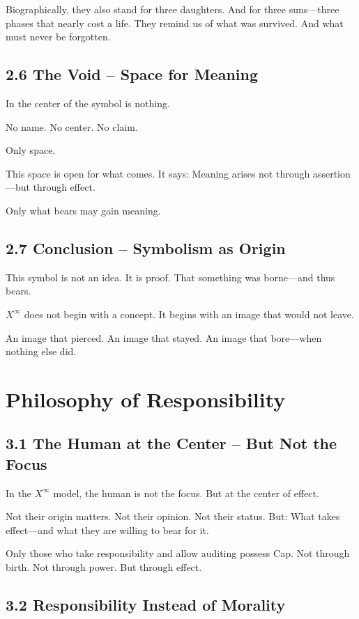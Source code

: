 \documentclass[12pt,a4paper]{book}
\begin{document}
Biographically, they also stand for three daughters.  
And for three suns—three phases that nearly cost a life.  
They remind us of what was survived. And what must never be forgotten.

\section*{2.6 The Void – Space for Meaning}

In the center of the symbol is nothing.

No name. No center. No claim.

Only space.

This space is open for what comes.  
It says: Meaning arises not through assertion—but through effect.

Only what bears may gain meaning.

\section*{2.7 Conclusion – Symbolism as Origin}

This symbol is not an idea.  
It is proof. That something was borne—and thus bears.

$X^\infty$ does not begin with a concept.  
It begins with an image that would not leave.

An image that pierced.  
An image that stayed.  
An image that bore—when nothing else did.

\chapter{Philosophy of Responsibility}

\section*{3.1 The Human at the Center – But Not the Focus}

In the $X^\infty$ model, the human is not the focus.  
But at the center of effect.

Not their origin matters. Not their opinion. Not their status.  
But: What takes effect—and what they are willing to bear for it.

Only those who take responsibility and allow auditing possess Cap.  
Not through birth. Not through power. But through effect.

\section*{3.2 Responsibility Instead of Morality}
\end{document}
